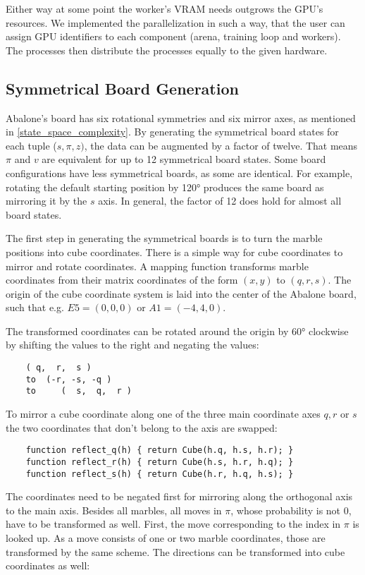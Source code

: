 Either way at some point the worker's VRAM needs outgrows the GPU's resources. We implemented the parallelization in such a way, that the user can assign GPU identifiers to each component (arena, training loop and workers). The processes then distribute the processes equally to the given hardware.

\subsection{Symmetrical Board Generation}
Abalone's board has six rotational symmetries and six mirror axes, as mentioned in \ref{state_space_complexity}. By generating the symmetrical board states for each tuple ($s, \pi, z)$, the data can be augmented by a factor of twelve. That means $\pi$ and $v$ are equivalent for up to 12 symmetrical board states. Some board configurations have less symmetrical boards, as some are identical. For example, rotating the default starting position by 120° produces the same board as mirroring it by the $s$ axis. In general, the factor of 12 does hold for almost all board states.

The first step in generating the symmetrical boards is to turn the marble positions into cube coordinates. There is a simple way for cube coordinates to mirror and rotate coordinates. A mapping function transforms marble coordinates from their matrix coordinates of the form $(x, y)$ to $(q, r, s)$. The origin of the cube coordinate system is laid into the center of the Abalone board, such that e.g. $E5 = (0, 0, 0)$ or $A1 = (-4, 4, 0)$.

The transformed coordinates can be rotated around the origin by 60° clockwise by shifting the values to the right and negating the values:

\begin{BVerbatim}
    ( q,  r,  s )
    to  (-r, -s, -q )
    to     (  s,  q,  r )
\end{BVerbatim}

To mirror a cube coordinate along one of the three main coordinate axes $q, r$ or $s$ the two coordinates that don't belong to the axis are swapped:

\begin{BVerbatim}
    function reflect_q(h) { return Cube(h.q, h.s, h.r); }
    function reflect_r(h) { return Cube(h.s, h.r, h.q); }
    function reflect_s(h) { return Cube(h.r, h.q, h.s); }
\end{BVerbatim}

The coordinates need to be negated first for mirroring along the orthogonal axis to the main axis. Besides all marbles, all moves in $\pi$, whose probability is not $0$, have to be transformed as well. First, the move corresponding to the index in $\pi$ is looked up. As a move consists of one or two marble coordinates, those are transformed by the same scheme. The directions can be transformed into cube coordinates as well:

